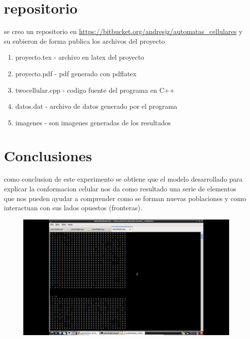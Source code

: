 \documentclass[a4paper,12pt]{article}
\begin{document}
\section{repositorio}
 se creo un repositorio en \url{https://bitbucket.org/andresjz/automatas_cellulares} y su subieron de forma publica
 los archivos del proyecto 
 \begin{enumerate} 
  \item proyecto.tex - archivo en latex del proyecto 
  \item proyecto.pdf - pdf generado con pdflatex
  \item twocellular.cpp - codigo fuente del programa en C++
  \item datos.dat    - archivo de datos generado por el programa
  \item imagenes - son imagenes generadas de los resultados
 \end{enumerate}

 
\section{Conclusiones}
 como conclusion de este experimento se obtiene que el modelo desarrollado para explicar la conformacion celular nos da como resultado una serie de elementos que nos pueden ayudar a comprender como se forman nuevas poblaciones y como interactuan con sus lados opuestos (fronteras).
\begin{figure}[htp]
\centering
\includegraphics[width=8.5      cm]{resultados.jpg}
\label{fig:lion}
\end{figure}
\end{document}
